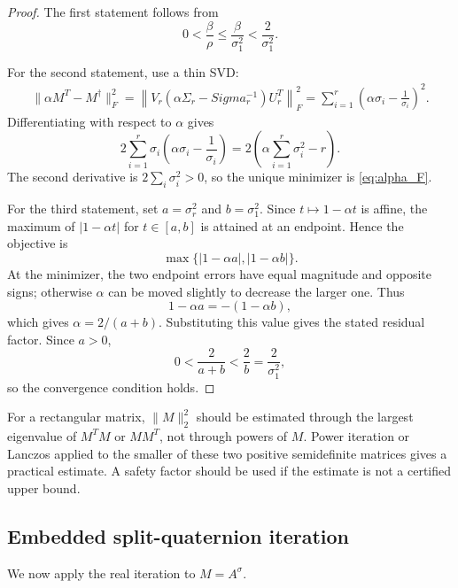 \documentclass[12pt,a4paper]{article}
\theoremstyle{plain}
\theoremstyle{definition}
\theoremstyle{remark}
\begin{document}
\begin{proof}
The first statement follows from
\[
    0<\frac{\beta}{\rho} \leq\frac{\beta}{\sigma_1^2} <\frac{2}{\sigma_1^2}.
\]

For the second statement, use a thin SVD:
\begin{align*}
    \|\alpha M^T - M^\dagger\|_F^2 =\left\|V_r (\alpha\Sigma_r - Sigma_r^{-1})U_r^T\right\|_F^2 =\sum_{i=1}^r\left(\alpha\sigma_i-\frac1{\sigma_i}\right)^2.
\end{align*}
Differentiating with respect to \(\alpha\) gives
\[
    2\sum_{i=1}^r\sigma_i \left(\alpha\sigma_i-\frac1{\sigma_i}\right) =2\left(\alpha\sum_{i=1}^r\sigma_i^2-r\right).
\]
The second derivative is \(2\sum_i\sigma_i^2>0\), so the unique minimizer is \eqref{eq:alpha_F}.

For the third statement, set \(a=\sigma_r^2\) and \(b=\sigma_1^2\). Since \(t\mapsto1-\alpha t\) is affine, the maximum of \(|1-\alpha t|\) for \(t\in[a,b]\) is attained at an endpoint. Hence the objective is
\[
    \max\{|1-\alpha a|,|1-\alpha b|\}.
\]
At the minimizer, the two endpoint errors have equal magnitude and opposite signs; otherwise \(\alpha\) can be moved slightly to decrease the larger one. Thus
\[
    1-\alpha a=-(1-\alpha b),
\]
which gives \(\alpha=2/(a+b)\). Substituting this value gives the stated residual factor. Since \(a>0\),
\[
    0<\frac{2}{a+b}<\frac{2}{b}=\frac{2}{\sigma_1^2},
\]
so the convergence condition holds.
\end{proof}

For a rectangular matrix, \(\|M\|_2^2\) should be estimated through the largest eigenvalue of \(M^TM\) or \(MM^T\), not through powers of \(M\). Power iteration or Lanczos applied to the smaller of these two positive semidefinite matrices gives a practical estimate. A safety factor should be used if the estimate is not a certified upper bound.

\subsection{Embedded split-quaternion iteration}
We now apply the real iteration to \(M=A^\sigma\).
\end{document}
